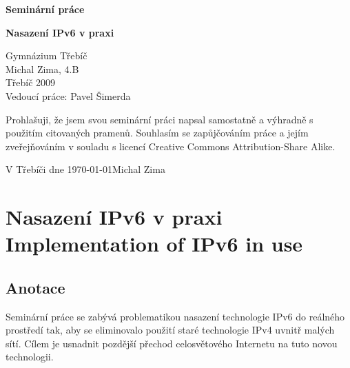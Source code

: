 \documentclass[12pt]{report}
\begin{document}
\thispagestyle{empty}
\begin{titlepage}
\begin{center}

\ \\
\ \\
\ \\
\ \\
\ \\

{\Large\bf Seminární práce}

\vspace{10mm}

{\Huge\bf Nasazení IPv6 v praxi}\\

\end{center}

\vspace{\fill}

{\large
\noindent Gymnázium Třebíč\\
\noindent Michal Zima, 4.B\\
\noindent Třebíč 2009\\
\noindent Vedoucí práce: Pavel Šimerda\\
}

\end{titlepage}
\setcounter{page}{2}  %

\thispagestyle{empty}
Prohlašuji, že jsem svou seminární práci napsal samostatně a výhradně s použitím citovaných pramenů. Souhlasím se zapůjčováním práce a jejím zveřejňováním v souladu s licencí Creative Commons Attribution-Share Alike.

\bigskip	%
\noindent V Třebíči dne \today \hspace{\fill}Michal Zima
\newpage{}


\thispagestyle{plain}
\section*{Nasazení IPv6 v praxi\\Implementation of IPv6 in use}

\subsection*{Anotace}
Seminární práce se zabývá problematikou nasazení technologie IPv6 do reálného prostředí tak, aby se eliminovalo použití staré technologie IPv4 uvnitř malých sítí. Cílem je usnadnit pozdější přechod celosvětového Internetu na tuto novou technologii.
\end{document}
